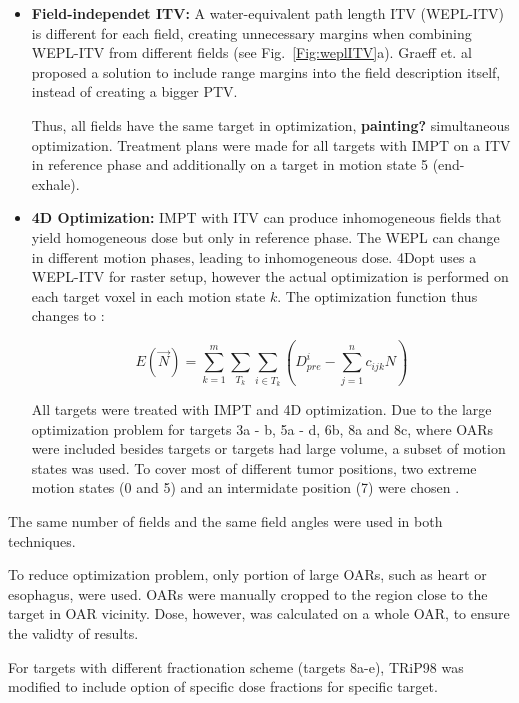 \documentclass[type=dr, dr=rernat, accentcolor=tud7b,colorbacktitle, bigchapter, openright, twoside, 12pt ]{tudthesis}
\begin{document}
\begin{itemize}
\item \textbf{Field-independet ITV:} A water-equivalent path length ITV (WEPL-ITV) is different for each field, creating unnecessary margins when combining WEPL-ITV from different fields (see Fig.~\ref{Fig:weplITV}a). 
Graeff et. al \cite{Graeff2012} proposed a solution to include range margins into the field description itself, instead of creating a bigger PTV. 

Thus, all fields have the same target in optimization, \textbf{painting?} simultaneous optimization. 
Treatment plans were made for all targets with IMPT on a ITV in reference phase and additionally on a target in motion state 5 (end-exhale).

\item \textbf{4D Optimization:} IMPT with ITV can produce inhomogeneous fields that yield homogeneous dose but only in reference phase. The WEPL can change in different motion phases, leading to inhomogeneous dose.
4Dopt uses a WEPL-ITV for raster setup, however the actual optimization is performed on each target voxel in each motion state $k$. The optimization function thus changes to \cite{Graeff2012}:

\begin{equation}
\label{eq-multiCost}
E(\vec{N}) = \sum_{k=1}^{m}\sum_{T_k} \sum_{i\in T_k} \left( D_{pre}^{i} -\sum_{j=1}^n c_{ijk}N\right)
\end{equation}

All targets were treated with IMPT and 4D optimization. Due to the large optimization problem for targets 3a - b, 5a - d, 6b, 8a and 8c, where OARs were included besides targets or targets had large volume, 
a subset of motion states was used. To cover most of different tumor positions, two extreme motion states (0 and 5) and an intermidate position (7) were chosen \cite{Graeff2012}.

\end{itemize}

The same number of fields and the same field angles were used in both techniques.

To reduce optimization problem, only portion of large OARs, such as heart or esophagus, were used. OARs were manually cropped to the region close to the target in OAR vicinity. Dose, however, was calculated
on a whole OAR, to ensure the validty of results.

For targets with different fractionation scheme (targets 8a-e), TRiP98 was modified to include option of specific dose fractions for specific target.
\end{document}
